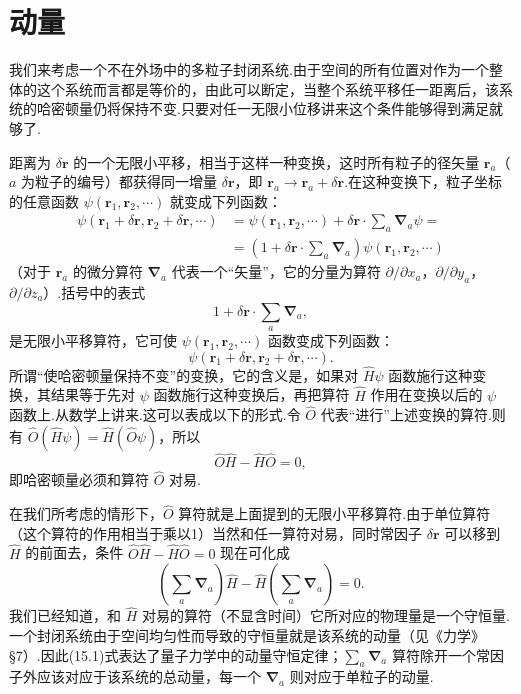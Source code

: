 \section{动量}

我们来考虑一个不在外场中的多粒子封闭系统.由于空间的所有位置对作为一个整体的这个系统而言都是等价的，由此可以断定，当整个系统平移任一距离后，该系统的哈密顿量仍将保持不变.只要对任一无限小位移讲来这个条件能够得到满足就够了.

距离为 $\delta\boldsymbol{r}$ 的一个无限小平移，相当于这样一种变换，这时所有粒子的径矢量 $\boldsymbol{r}_a$（$a$ 为粒子的编号）都获得同一增量 $\delta\boldsymbol{r}$，即 $\boldsymbol{r}_a\to\boldsymbol{r}_a+\delta\boldsymbol{r}$.在这种变换下，粒子坐标的任意函数 $\psi(\boldsymbol{r}_1,\boldsymbol{r}_2,\cdots)$ 就变成下列函数：
\begin{equation*}
\begin{aligned}
  \psi(\boldsymbol{r}_1+\delta\boldsymbol{r},\boldsymbol{r}_2+\delta\boldsymbol{r},\cdots)
  &=\psi(\boldsymbol{r}_1,\boldsymbol{r}_2,\cdots)
  +\delta\boldsymbol{r}\cdot\sum_a\boldsymbol{\nabla}_a\psi=\\
  &=\left(1+\delta\boldsymbol{r}\cdot\sum_a\boldsymbol{\nabla}_a\right)
  \psi(\boldsymbol{r}_1,\boldsymbol{r}_2,\cdots)
\end{aligned}
\end{equation*}
（对于 $\boldsymbol{r}_a$ 的微分算符 $\boldsymbol{\nabla}_a$ 代表一个“矢量”，它的分量为算符 $\partial/\partial x_a$，$\partial/\partial y_a$，$\partial/\partial z_a$）.括号中的表式
\begin{equation*}
  1+\delta\boldsymbol{r}\cdot\sum_a\boldsymbol{\nabla}_a,
\end{equation*}
是无限小平移算符，它可使 $\psi(\boldsymbol{r}_1,\boldsymbol{r}_2,\cdots)$ 函数变成下列函数：
\begin{equation*}
  \psi(\boldsymbol{r}_1+\delta\boldsymbol{r},\boldsymbol{r}_2+\delta\boldsymbol{r},\cdots).
\end{equation*}
所谓“使哈密顿量保持不变”的变换，它的含义是，如果对 $\hat{H}\psi$ 函数施行这种变换，其结果等于先对 $\psi$ 函数施行这种变换后，再把算符 $\hat{H}$ 作用在变换以后的 $\psi$ 函数上.从数学上讲来.这可以表成以下的形式.令 $\hat{O}$ 代表“进行”上述变换的算符.则有 $\hat{O}(\hat{H}\psi)=\hat{H}(\hat{O}\psi)$，所以
\begin{equation*}
  \hat{O}\hat{H}-\hat{H}\hat{O}=0,
\end{equation*}
即哈密顿量必须和算符 $\hat{O}$ 对易.

在我们所考虑的情形下，$\hat{O}$ 算符就是上面提到的无限小平移算符.由于单位算符（这个算符的作用相当于乘以1）当然和任一算符对易，同时常因子 $\delta\boldsymbol{r}$ 可以移到 $\hat{H}$ 的前面去，条件 $\hat{O}\hat{H}-\hat{H}\hat{O}=0$ 现在可化成
\begin{equation}
  \left(\sum_a\boldsymbol{\nabla}_a\right)\hat{H}
  -\hat{H}\left(\sum_a\boldsymbol{\nabla}_a\right)=0.
\end{equation}
我们已经知道，和 $\hat{H}$ 对易的算符（不显含时间）它所对应的物理量是一个守恒量.一个封闭系统由于空间均匀性而导致的守恒量就是该系统的动量（见《力学》§7）.因此(15.1)式表达了量子力学中的动量守恒定律；$\sum_a\boldsymbol{\nabla}_a$ 算符除开一个常因子外应该对应于该系统的总动量，每一个 $\boldsymbol{\nabla}_a$ 则对应于单粒子的动量.

